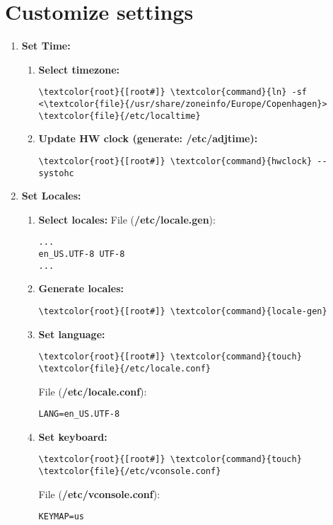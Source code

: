 \documentclass[10pt, a4paper, onecolumn, openany]{book} %
\begin{document}
\section{Customize settings}
\begin{enumerate}
    \item \textbf{Set Time:}
    \begin{enumerate}
        \item \textbf{Select timezone:}
\begin{Verbatim}[commandchars=\\\{\}]
\textcolor{root}{[root#]} \textcolor{command}{ln} -sf <\textcolor{file}{/usr/share/zoneinfo/Europe/Copenhagen}> \textcolor{file}{/etc/localtime}
\end{Verbatim}
    \item \textbf{Update HW clock (generate: /etc/adjtime):}
\begin{Verbatim}[commandchars=\\\{\}]
\textcolor{root}{[root#]} \textcolor{command}{hwclock} --systohc
\end{Verbatim}
    \end{enumerate}

    \item \textbf{Set Locales:}
    \begin{enumerate}
        \item \textbf{Select locales:}
\newline File (\textbf{\textcolor{file}{/etc/locale.gen}}):
\begin{Verbatim}[commandchars=\\\{\}]
...
en_US.UTF-8 UTF-8
...
\end{Verbatim}
        \item \textbf{Generate locales:}
\begin{Verbatim}[commandchars=\\\{\}]
\textcolor{root}{[root#]} \textcolor{command}{locale-gen}
\end{Verbatim}      
        \item \textbf{Set language:}
\begin{Verbatim}[commandchars=\\\{\}]
\textcolor{root}{[root#]} \textcolor{command}{touch} \textcolor{file}{/etc/locale.conf}
\end{Verbatim}    
File (\textbf{\textcolor{file}{/etc/locale.conf}}):
\begin{Verbatim}[commandchars=\\\{\}]
LANG=en_US.UTF-8
\end{Verbatim}
        \item \textbf{Set keyboard:}
\begin{Verbatim}[commandchars=\\\{\}]
\textcolor{root}{[root#]} \textcolor{command}{touch} \textcolor{file}{/etc/vconsole.conf}
\end{Verbatim}    
File (\textbf{\textcolor{file}{/etc/vconsole.conf}}):
\begin{Verbatim}[commandchars=\\\{\}]
KEYMAP=us
\end{Verbatim}
        \end{enumerate}


\end{enumerate}
\end{document}
